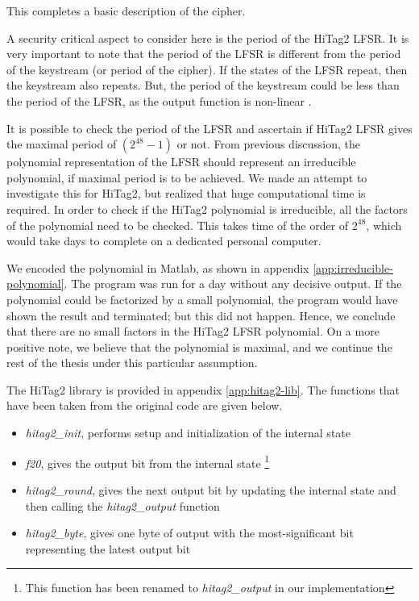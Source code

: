 This completes a basic description of the cipher. 

A security critical aspect to consider here is the period of the HiTag2 LFSR. It is very important to note that the period of the LFSR is different from the period of the keystream (or period of the cipher). If the states of the LFSR repeat, then the keystream also repeats. But, the period of the keystream could be less than the period of the LFSR, as the output function is non-linear \cite{erik-discussions}. 

It is possible to check the period of the LFSR and ascertain if HiTag2 LFSR gives the maximal period of $(2^{48} - 1)$ or not. From previous discussion, the polynomial representation of the LFSR should represent an irreducible polynomial, if maximal period is to be achieved. We made an attempt to investigate this for HiTag2, but realized that huge computational time is required. In order to check if the HiTag2 polynomial is irreducible, all the factors of the polynomial need to be checked. This takes time of the order of $2^{48}$, which would take days to complete on a dedicated personal computer.

We encoded the polynomial in Matlab, as shown in appendix \ref{app:irreducible-polynomial}. The program was run for a day without any decisive output. If the polynomial could be factorized by a small polynomial, the program would have shown the result and terminated; but this did not happen. Hence, we conclude that there are no small factors in the HiTag2 LFSR polynomial. On a more positive note, we believe that the polynomial is maximal, and we continue the rest of the thesis under this particular assumption.

The HiTag2 library is provided in appendix \ref{app:hitag2-lib}. The functions that have been taken from the original code \cite{hitag2-code} are given below.
\begin{itemize}
\item \textit{hitag2\_init}, performs setup and initialization of the internal state
\item \textit{f20}, gives the output bit from the internal state \footnote{This function has been renamed to \textit{hitag2\_output} in our implementation}
\item \textit{hitag2\_round}, gives the next output bit by updating the internal state and then calling the \textit{hitag2\_output} function
\item \textit{hitag2\_byte}, gives one byte of output with the most-significant bit representing the latest output bit
\end{itemize}

